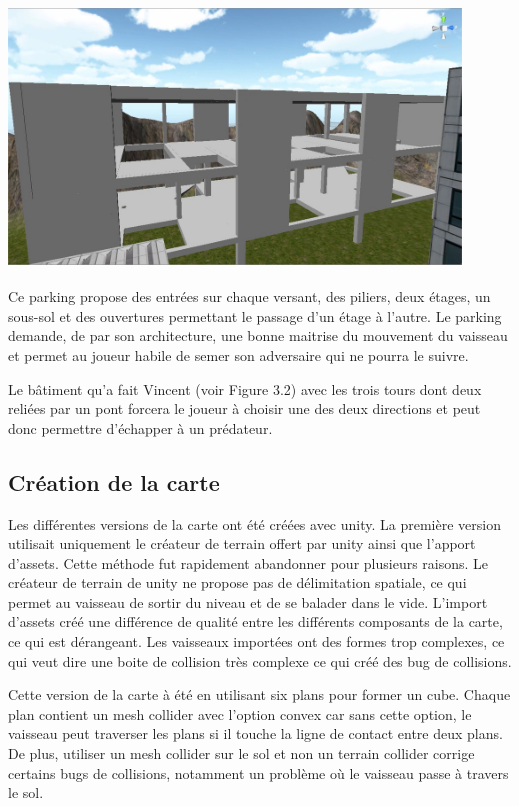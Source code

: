 \documentclass[10pt, titlepage]{report}
\begin{document}
\begin{center}
\includegraphics[height=7cm, width=12cm]{parking_guillaume.jpg}\\
\end{center}

Ce parking propose des entrées sur chaque versant, des piliers, deux étages, un sous-sol et des ouvertures permettant le passage d'un étage à l'autre. Le parking demande, de par son architecture, une bonne maitrise du mouvement du vaisseau et permet au joueur habile de semer son adversaire qui ne pourra le suivre.

 Le bâtiment qu'a fait Vincent (voir Figure 3.2) avec les trois tours dont deux reliées par un pont forcera le joueur à choisir une des deux directions et peut donc permettre d'échapper à un prédateur.


\subsection{Création de la carte}

Les différentes versions de la carte ont été créées avec unity. La première version utilisait uniquement le créateur de terrain offert par unity ainsi que l'apport d'assets. Cette méthode fut rapidement abandonner pour plusieurs raisons. Le créateur de terrain de unity ne propose pas de délimitation spatiale, ce qui permet au vaisseau de sortir du niveau et de se balader dans le vide. L'import d'assets créé une différence de qualité entre les différents composants de la carte, ce qui est dérangeant. Les vaisseaux importées ont des formes trop complexes, ce qui veut dire une boite de collision très complexe ce qui créé des bug de collisions.

Cette version de la carte à été en utilisant six plans pour former un cube. Chaque plan contient un mesh collider avec l'option convex car sans cette option, le vaisseau peut traverser les plans si il touche la ligne de contact entre deux plans. De plus, utiliser un mesh collider sur le sol et non un terrain collider corrige certains bugs de collisions, notamment un problème où le vaisseau passe à travers le sol.\\
\end{document}
